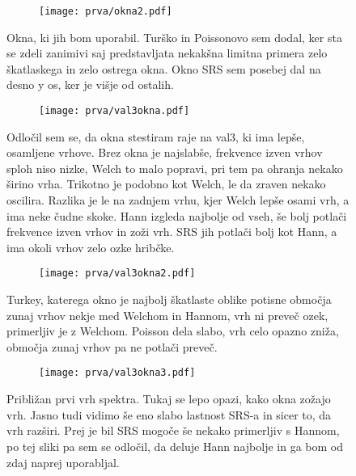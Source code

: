 \documentclass{article}
\begin{document}
\begin{figure}[H]
\centering
\begin{subfigure}{.8\textwidth}
\texttt{[image: prva/okna2.pdf]}
\end{subfigure}
\caption*{Okna, ki jih bom uporabil. Turško in Poissonovo sem dodal, ker sta se zdeli zanimivi saj predstavljata nekakšna limitna primera zelo škatlaskega in zelo ostrega okna. Okno SRS sem posebej dal na desno y os, ker je višje od ostalih.}
\end{figure}

\begin{figure}[H]
\centering
\begin{subfigure}{.8\textwidth}
\texttt{[image: prva/val3okna.pdf]}
\end{subfigure}
\caption*{Odločil sem se, da okna stestiram raje na val3, ki ima lepše, osamljene vrhove. Brez okna je najslabše, frekvence izven vrhov sploh niso nizke, Welch to malo popravi, pri tem pa ohranja nekako širino vrha. Trikotno je podobno kot Welch, le da zraven nekako oscilira. Razlika je le na zadnjem vrhu, kjer Welch lepše osami vrh, a ima neke čudne skoke. Hann izgleda najbolje od vseh, še bolj potlači frekvence izven vrhov in zoži vrh. SRS jih potlači bolj kot Hann, a ima okoli vrhov zelo ozke hribčke.}
\end{figure}

\begin{figure}[H]
\centering
\begin{subfigure}{.8\textwidth}
\texttt{[image: prva/val3okna2.pdf]}
\end{subfigure}
\caption*{Turkey, katerega okno je najbolj škatlaste oblike
potisne območja zunaj vrhov nekje med Welchom in Hannom, vrh ni preveč ozek, primerljiv je z Welchom.
Poisson dela slabo, vrh celo opazno zniža, območja zunaj vrhov pa ne potlači preveč.}
\end{figure}

\begin{figure}[H]
\centering
\begin{subfigure}{.8\textwidth}
\texttt{[image: prva/val3okna3.pdf]}
\end{subfigure}
\caption*{Približan prvi vrh spektra. Tukaj se lepo opazi, kako okna zožajo vrh. Jasno tudi vidimo še eno slabo lastnost SRS-a in sicer to, da vrh razširi. Prej je bil SRS mogoče še nekako primerljiv s Hannom, po tej sliki pa sem se odločil, da deluje Hann najbolje in ga bom od zdaj naprej uporabljal.}
\end{figure}
\end{document}
